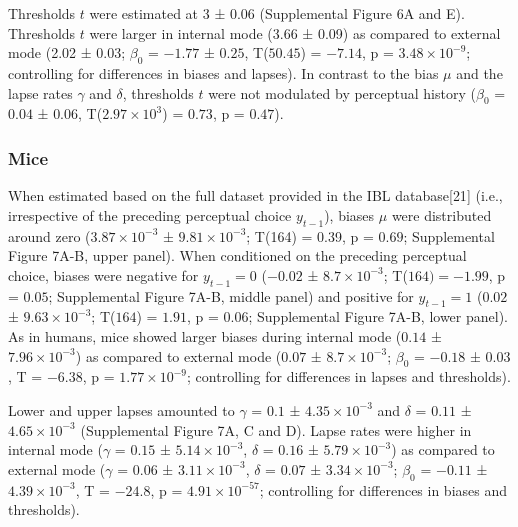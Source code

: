 \documentclass[
]{article}
\begin{document}
Thresholds \(t\) were estimated at 3 ± 0.06 (Supplemental Figure 6A and
E). Thresholds \(t\) were larger in internal mode (3.66 ± 0.09) as
compared to external mode (2.02 ± 0.03; \(\beta_0\) = \(-1.77\) ±
\(0.25\), T(\(50.45\)) = \(-7.14\), p =
\(\ensuremath{3.48\times 10^{-9}}\); controlling for differences in
biases and lapses). In contrast to the bias \(\mu\) and the lapse rates
\(\gamma\) and \(\delta\), thresholds \(t\) were not modulated by
perceptual history (\(\beta_0\) = \(0.04\) ± \(0.06\),
T(\(\ensuremath{2.97\times 10^{3}}\)) = \(0.73\), p = \(0.47\)).

\hypertarget{mice}{%
\subsubsection{Mice}\label{mice}}

When estimated based on the full dataset provided in the IBL
database{[}21{]} (i.e., irrespective of the preceding perceptual choice
\(y_{t-1}\)), biases \(\mu\) were distributed around zero
(\(\ensuremath{3.87\times 10^{-3}}\) ±
\(\ensuremath{9.81\times 10^{-3}}\); T(164) = 0.39, p = \(0.69\);
Supplemental Figure 7A-B, upper panel). When conditioned on the
preceding perceptual choice, biases were negative for \(y_{t-1} = 0\)
(\(-0.02\) ± \(\ensuremath{8.7\times 10^{-3}}\); T(\(164) = -1.99\), p =
\(0.05\); Supplemental Figure 7A-B, middle panel) and positive for
\(y_{t-1} = 1\) (\(0.02\) ± \(\ensuremath{9.63\times 10^{-3}}\);
T(\(164\)) = \(1.91\), p = \(0.06\); Supplemental Figure 7A-B, lower
panel). As in humans, mice showed larger biases during internal mode
(\(0.14\) ± \(\ensuremath{7.96\times 10^{-3}}\)) as compared to external
mode (\(0.07\) ± \(\ensuremath{8.7\times 10^{-3}}\); \(\beta_0\) =
\(-0.18\) ± \(0.03\), T = \(-6.38\), p =
\(\ensuremath{1.77\times 10^{-9}}\); controlling for differences in
lapses and thresholds).

Lower and upper lapses amounted to \(\gamma\) = \(0.1\) ±
\(\ensuremath{4.35\times 10^{-3}}\) and \(\delta\) = \(0.11\) ±
\(\ensuremath{4.65\times 10^{-3}}\) (Supplemental Figure 7A, C and D).
Lapse rates were higher in internal mode (\(\gamma\) = \(0.15\) ±
\(\ensuremath{5.14\times 10^{-3}}\), \(\delta\) = \(0.16\) ±
\(\ensuremath{5.79\times 10^{-3}}\)) as compared to external mode
(\(\gamma\) = \(0.06\) ± \(\ensuremath{3.11\times 10^{-3}}\), \(\delta\)
= \(0.07\) ± \(\ensuremath{3.34\times 10^{-3}}\); \(\beta_0\) =
\(-0.11\) ± \(\ensuremath{4.39\times 10^{-3}}\), T = \(-24.8\), p =
\(\ensuremath{4.91\times 10^{-57}}\); controlling for differences in
biases and thresholds).
\end{document}
